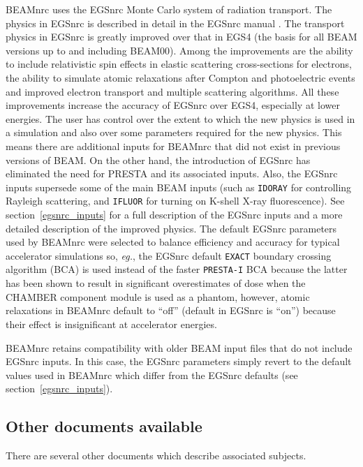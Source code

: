 \documentclass[12pt,twoside]{article}
\newcommand{\eg}{{\em eg.}}
\begin{document}
BEAMnrc uses the EGSnrc Monte Carlo system of radiation transport.  The
physics in EGSnrc is described in detail in the EGSnrc manual
\cite{KR03}.  The transport physics in EGSnrc is greatly improved
over that in EGS4 (the basis for all BEAM versions up to and including
BEAM00).  Among the improvements are the ability to include relativistic
spin effects in elastic scattering cross-sections for electrons, the ability
to simulate atomic relaxations after Compton and photoelectric events and
improved electron transport and multiple scattering algorithms.
All these improvements increase the accuracy of EGSnrc over EGS4, especially at lower energies.
The user has control over the extent to which the new physics is used in
a simulation and also over some parameters required for the new physics.  This
means there are additional inputs for BEAMnrc that did not exist in
previous versions of BEAM.   On the other hand, the introduction of EGSnrc
has eliminated the need for PRESTA and its associated inputs. Also,
the EGSnrc inputs supersede some of the main BEAM inputs
(such as {\tt IDORAY} for controlling Rayleigh scattering, and
{\tt IFLUOR} for turning on K-shell X-ray fluorescence).  See
section~\ref{egsnrc_inputs} for a full description of the EGSnrc inputs
and a more detailed description of the improved physics.  The default
EGSnrc parameters used by BEAMnrc were selected to balance efficiency and
accuracy for typical accelerator simulations so,
\eg, the EGSnrc default {\tt EXACT} boundary crossing algorithm (BCA) is
used instead of the faster {\tt PRESTA-I} BCA because the latter has
been shown to result in significant overestimates of dose when the
CHAMBER component module is used as a phantom\cite{WK06}, however,
atomic relaxations in BEAMnrc default to ``off'' (default in EGSnrc is ``on'')
because their effect is insignificant at accelerator energies.

BEAMnrc retains compatibility with older BEAM input files that do not
include EGSnrc inputs.  In this case, the EGSnrc parameters simply
revert to the default values used in BEAMnrc which differ from the EGSnrc
defaults (see section~\ref{egsnrc_inputs}).


\subsection{Other documents available}
\label{oda}

There are several other documents which describe associated subjects.
\end{document}
